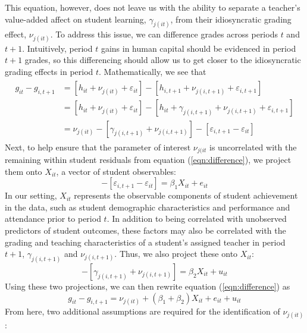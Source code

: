 \documentclass[../thesis_main.tex]{subfiles}
\begin{document}
This equation, however, does not leave us with the ability to separate a teacher's value-added affect on student learning, $\gamma_{j(it)}$, from their idiosyncratic grading effect, $\nu_{j(it)}$. 
To address this issue, we can difference grades across periods $t$ and $t+1$. Intuitively, period $t$ gains in human capital should be evidenced in period $t+1$ grades, so this differencing should allow us to get closer to the idiosyncratic grading effects in period $t$. Mathematically, we see that
\begin{align}
\begin{split}
	\label{eqn:difference}
	g_{it}-g_{i,t+1} & = 
	[h_{it}+\nu_{j(it)}+\varepsilon_{it}] 
	- [h_{i,t+1} + \nu_{j(i,t+1)} + \varepsilon_{i,t+1}]\\
	& = [h_{it}+\nu_{j(it)}+\varepsilon_{it}]  -
	[h_{it}+\gamma_{j(i,t+1)}+\nu_{j(i,t+1)} + \varepsilon_{i,t+1}]\\
	& = \nu_{j(it)} - [\gamma_{j(i,t+1)} + \nu_{j(i,t+1)}] - [\varepsilon_{i,t+1}-\varepsilon_{it}]
\end{split}
\end{align}
Next, to help ensure that the parameter of interest $\nu_{j(it}$ is uncorrelated with the remaining within student residuals from equation (\ref{eqn:difference}), we project them onto $X_{it}$, a vector of student observables:
\begin{equation}
	-[\varepsilon_{i,t+1}-\varepsilon_{it}] = \beta_1 X_{it} + e_{it}
\end{equation}
In our setting, $X_{it}$ represents the observable components of student achievement in the data, such as student demographic characteristics and performance and attendance prior to period $t$. In addition to being correlated with unobserved predictors of student outcomes, these factors may also be correlated with the grading and teaching characteristics of a student's assigned teacher in period $t+1$, $\gamma_{j(i,t+1)}$ and $\nu_{j(i,t+1)}$. Thus, we also project these onto $X_{it}$:
\begin{equation}
	-[\gamma_{j(i,t+1)}+\nu_{j(i,t+1)}] = \beta_2 X_{it} + u_{it}
\end{equation}
Using these two projections, we can then rewrite equation (\ref{eqn:difference}) as 
\begin{equation}
	\label{eqn:final}
	g_{it}-g_{i,t+1}=\nu_{j(it)} + (\beta_1 + \beta_2) X_{it} + e_{it} + u_{it} 
\end{equation}
From here, two additional assumptions are required for the identification of $\nu_{j(it)}$:
\end{document}
